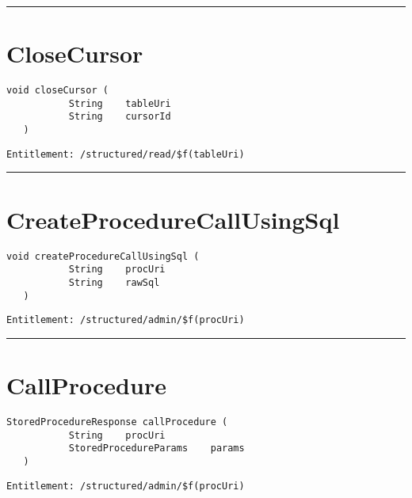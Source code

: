 \rule{12cm}{2pt}
\section{CloseCursor}
\label{Api:CloseCursor}
\begin{lstlisting}[style=nonumbers]
   void closeCursor (
           String    tableUri
           String    cursorId
   )
\end{lstlisting}
\begin{Verbatim}[formatcom=\color{Maroon}]
  Entitlement: /structured/read/$f(tableUri)
\end{Verbatim}



\rule{12cm}{2pt}
\section{CreateProcedureCallUsingSql}
\label{Api:CreateProcedureCallUsingSql}
\begin{lstlisting}[style=nonumbers]
   void createProcedureCallUsingSql (
           String    procUri
           String    rawSql
   )
\end{lstlisting}
\begin{Verbatim}[formatcom=\color{Maroon}]
  Entitlement: /structured/admin/$f(procUri)
\end{Verbatim}



\rule{12cm}{2pt}
\section{CallProcedure}
\label{Api:CallProcedure}
\begin{lstlisting}[style=nonumbers]
   StoredProcedureResponse callProcedure (
           String    procUri
           StoredProcedureParams    params
   )
\end{lstlisting}
\begin{Verbatim}[formatcom=\color{Maroon}]
  Entitlement: /structured/admin/$f(procUri)
\end{Verbatim}



